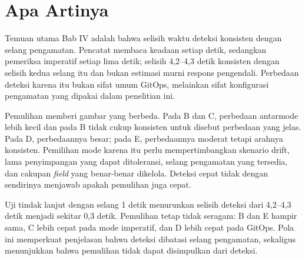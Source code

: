 \section{Apa Artinya}
\label{sec:apa-artinya}

Temuan utama Bab IV adalah bahwa selisih waktu deteksi konsisten dengan selang pengamatan. Pencatat membaca keadaan setiap detik, sedangkan pemeriksa imperatif setiap lima detik; selisih 4,2--4,3 detik konsisten dengan selisih kedua selang itu dan bukan estimasi murni respons pengendali. Perbedaan deteksi karena itu bukan sifat umum GitOps, melainkan sifat konfigurasi pengamatan yang dipakai dalam penelitian ini.

Pemulihan memberi gambar yang berbeda. Pada B dan C, perbedaan antarmode lebih kecil dan pada B tidak cukup konsisten untuk disebut perbedaan yang jelas. Pada D, perbedaannya besar; pada E, perbedaannya moderat tetapi arahnya konsisten. Pemilihan mode karena itu perlu mempertimbangkan skenario drift, lama penyimpangan yang dapat ditoleransi, selang pengamatan yang tersedia, dan cakupan \textit{field} yang benar-benar dikelola. Deteksi cepat tidak dengan sendirinya menjawab apakah pemulihan juga cepat.

Uji tindak lanjut dengan selang 1 detik menurunkan selisih deteksi dari 4,2--4,3 detik menjadi sekitar 0,3 detik. Pemulihan tetap tidak seragam: B dan E hampir sama, C lebih cepat pada mode imperatif, dan D lebih cepat pada GitOps. Pola ini memperkuat penjelasan bahwa deteksi dibatasi selang pengamatan, sekaligus menunjukkan bahwa pemulihan tidak dapat disimpulkan dari deteksi.

